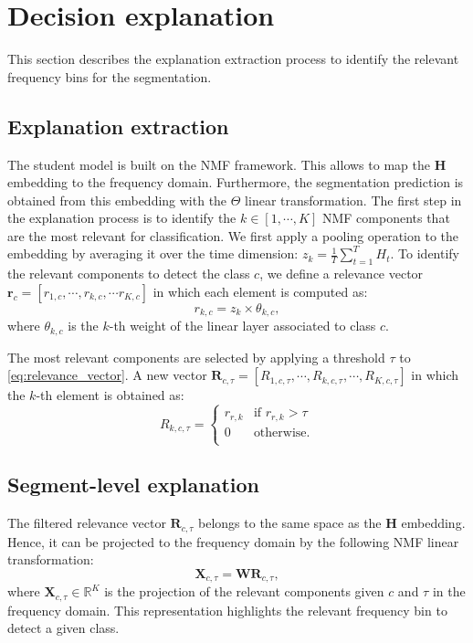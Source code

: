 \section{Decision explanation}

This section describes the explanation extraction process to identify the relevant frequency bins for the segmentation.

\subsection{Explanation extraction}

The student model is built on the NMF framework.
This allows to map the $\mathbf{H}$ embedding to the frequency domain.
Furthermore, the segmentation prediction is obtained from this embedding with the $\Theta$ linear transformation.
The first step in the explanation process is to identify the $k\in [1,\cdots, K]$ NMF components that are the most relevant for classification.
We first apply a pooling operation to the embedding by averaging it over the time dimension: $z_k = \frac{1}{T}\sum_{t=1}^T H_t$.
To identify the relevant components to detect the class $c$, we define a relevance vector $\mathbf{r}_c=[r_{1,c}, \cdots, r_{k,c}, \cdots r_{K,c}]$ in which each element is computed as:
\begin{equation}
    r_{k,c} = z_k \times \theta_{k,c},
    \label{eq:relevance_vector}
\end{equation}
where $\theta_{k,c}$ is the $k$-th weight of the linear layer associated to class $c$.

The most relevant components are selected by applying a threshold $\tau$ to \eqref{eq:relevance_vector}. 
A new vector $\mathbf{R}_{c,\tau}= [R_{1,c,\tau},\cdots,R_{k,c,\tau},\cdots, R_{K,c,\tau}]$ in which the $k$-th element is obtained as:
\begin{equation}
    R_{k,c,\tau} = 
    \begin{cases}
        r_{r,k} & \text{if } r_{r,k} > \tau \\
        0       & \text{otherwise}. \\
    \end{cases}
\end{equation}

\subsection{Segment-level explanation}

The filtered relevance vector $\mathbf{R}_{c,\tau}$ belongs to the same space as the $\mathbf{H}$ embedding.
Hence, it can be projected to the frequency domain by the following NMF linear transformation:
\begin{equation}
    \mathbf{X}_{c,\tau} = \mathbf{W}\mathbf{R}_{c,\tau},
\end{equation}
where $\mathbf{X}_{c,\tau}\in\mathbb{R}^{K}$ is the projection of the relevant components given $c$ and $\tau$ in the frequency domain.
This representation highlights the relevant frequency bin to detect a given class.

